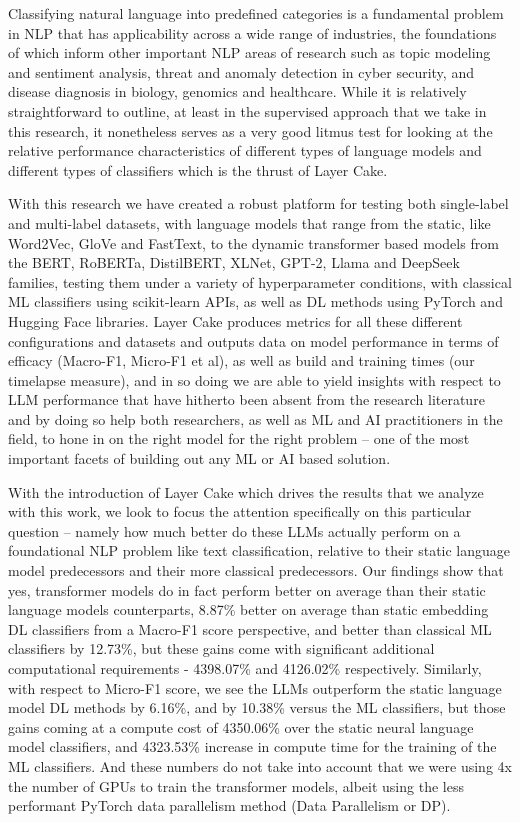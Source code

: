 \documentclass[final]{clv2025}
\begin{document}
Classifying natural language into predefined categories is a fundamental problem in NLP that has applicability across a wide range of industries, the foundations of which inform other important NLP areas of research such as topic modeling and sentiment analysis, threat and anomaly detection in cyber security, and disease diagnosis in biology, genomics and healthcare. While it is relatively straightforward to outline, at least in the supervised approach that we take in this research, it nonetheless serves as a very good litmus test for looking at the relative performance characteristics of different types of language models and different types of classifiers which is the thrust of Layer Cake.

With this research we have created a robust platform for testing both single-label and multi-label datasets, with language models that range from the static, like Word2Vec, GloVe and FastText, to the dynamic transformer based models from the BERT, RoBERTa, DistilBERT, XLNet, GPT-2, Llama and DeepSeek families, testing them under a variety of hyperparameter conditions, with classical ML classifiers using scikit-learn APIs, as well as DL methods using PyTorch and Hugging Face libraries. Layer Cake produces metrics for all these different configurations and datasets and outputs data on model performance in terms of efficacy (Macro-F1, Micro-F1 et al), as well as build and training times (our timelapse measure), and in so doing we are able to yield insights with respect to LLM performance that have hitherto been absent from the research literature and by doing so help both researchers, as well as ML and AI practitioners in the field, to hone in on the right model for the right problem – one of the most important facets of building out any ML or AI based solution.

With the introduction of Layer Cake which drives the results that we analyze with this work, we look to focus the attention specifically on this particular question – namely how much better do these LLMs actually perform on a foundational NLP problem like text classification, relative to their static language model predecessors and their more classical predecessors. Our findings show that yes, transformer models do in fact perform better on average than their static language models counterparts, 8.87\% better on average than static embedding DL classifiers from a Macro-F1 score perspective, and better than classical ML classifiers by 12.73\%, but these gains come with significant additional computational requirements - 4398.07\% and 4126.02\% respectively. Similarly, with respect to Micro-F1 score, we see the LLMs outperform the static language model DL methods by 6.16\%, and by 10.38\% versus the ML classifiers, but those gains coming at a compute cost of 4350.06\% over the static neural language model classifiers, and 4323.53\% increase in compute time for the training of the ML classifiers. And these numbers do not take into account that we were using 4x the number of GPUs to train the transformer models, albeit using the less performant PyTorch data parallelism method (Data Parallelism or DP).
\end{document}
